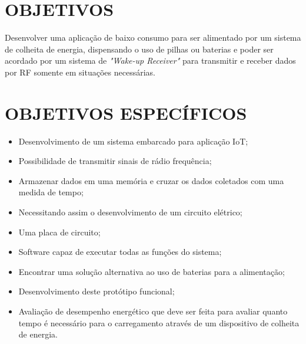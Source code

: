 \section{OBJETIVOS}
Desenvolver uma aplicação de baixo consumo para ser alimentado por um sistema de colheita de energia, dispensando o uso de pilhas ou baterias e poder ser acordado por um sistema de \textit{"Wake-up Receiver"} para transmitir e receber dados por RF somente em situações necessárias. 


\section{OBJETIVOS ESPECÍFICOS}
\begin{itemize}
    \item Desenvolvimento de um sistema embarcado para aplicação IoT;
    \item Possibilidade de transmitir sinais de rádio frequência;
    \item Armazenar dados em uma memória e cruzar os dados coletados com uma medida de tempo;
    \item Necessitando assim o desenvolvimento de um circuito elétrico;
    \item Uma placa de circuito;
    \item Software capaz de executar todas as funções do sistema;
    \item Encontrar uma solução alternativa ao uso de baterias para a alimentação;
    \item Desenvolvimento deste protótipo funcional;
    \item Avaliação de desempenho energético que deve ser feita para avaliar quanto tempo é necessário para o carregamento através de um dispositivo de colheita de energia.
\end{itemize}









